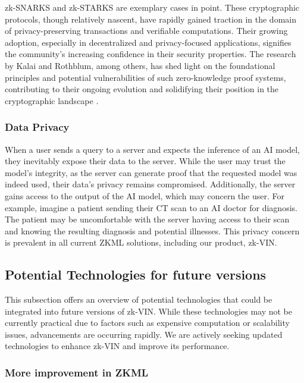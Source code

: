 \documentclass[conference]{IEEEtran}
\begin{document}
zk-SNARKS and zk-STARKS are exemplary cases in point. These cryptographic protocols, though relatively nascent, have rapidly gained traction in the domain of privacy-preserving transactions and veriﬁable computations. Their growing adoption, especially in decentralized and privacy-focused applications, signiﬁes the community’s increasing conﬁdence in their security properties. The research by Kalai and Rothblum, among others, has shed light on the foundational principles and potential vulnerabilities of such zero-knowledge proof systems, contributing to their ongoing evolution and solidifying their position in the cryptographic landscape \cite{Kalai2017FromOT}.

\subsubsection{Data Privacy}

When a user sends a query to a server and expects the inference of an AI model, they inevitably expose their data to the server. While the user may trust the model's integrity, as the server can generate proof that the requested model was indeed used, their data's privacy remains compromised. Additionally, the server gains access to the output of the AI model, which may concern the user. For example, imagine a patient sending their CT scan to an AI doctor for diagnosis. The patient may be uncomfortable with the server having access to their scan and knowing the resulting diagnosis and potential illnesses. This privacy concern is prevalent in all current ZKML solutions, including our product, zk-VIN.


\subsection{Potential Technologies for future versions}

This subsection offers an overview of potential technologies that could be integrated into future versions of zk-VIN. While these technologies may not be currently practical due to factors such as expensive computation or scalability issues, advancements are occurring rapidly. We are actively seeking updated technologies to enhance zk-VIN and improve its performance.


\subsubsection{More improvement in ZKML}
\end{document}

